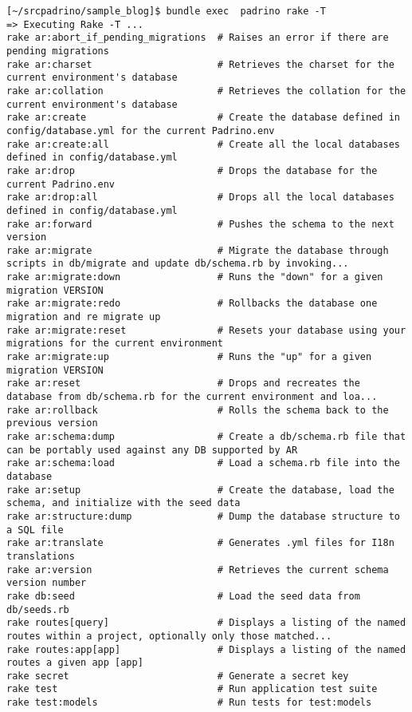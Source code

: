 \begin{verbatim}
[~/srcpadrino/sample_blog]$ bundle exec  padrino rake -T
=> Executing Rake -T ...
rake ar:abort_if_pending_migrations  # Raises an error if there are pending migrations
rake ar:charset                      # Retrieves the charset for the current environment's database
rake ar:collation                    # Retrieves the collation for the current environment's database
rake ar:create                       # Create the database defined in config/database.yml for the current Padrino.env
rake ar:create:all                   # Create all the local databases defined in config/database.yml
rake ar:drop                         # Drops the database for the current Padrino.env
rake ar:drop:all                     # Drops all the local databases defined in config/database.yml
rake ar:forward                      # Pushes the schema to the next version
rake ar:migrate                      # Migrate the database through scripts in db/migrate and update db/schema.rb by invoking...
rake ar:migrate:down                 # Runs the "down" for a given migration VERSION
rake ar:migrate:redo                 # Rollbacks the database one migration and re migrate up
rake ar:migrate:reset                # Resets your database using your migrations for the current environment
rake ar:migrate:up                   # Runs the "up" for a given migration VERSION
rake ar:reset                        # Drops and recreates the database from db/schema.rb for the current environment and loa...
rake ar:rollback                     # Rolls the schema back to the previous version
rake ar:schema:dump                  # Create a db/schema.rb file that can be portably used against any DB supported by AR
rake ar:schema:load                  # Load a schema.rb file into the database
rake ar:setup                        # Create the database, load the schema, and initialize with the seed data
rake ar:structure:dump               # Dump the database structure to a SQL file
rake ar:translate                    # Generates .yml files for I18n translations
rake ar:version                      # Retrieves the current schema version number
rake db:seed                         # Load the seed data from db/seeds.rb
rake routes[query]                   # Displays a listing of the named routes within a project, optionally only those matched...
rake routes:app[app]                 # Displays a listing of the named routes a given app [app]
rake secret                          # Generate a secret key
rake test                            # Run application test suite
rake test:models                     # Run tests for test:models

\end{verbatim}

